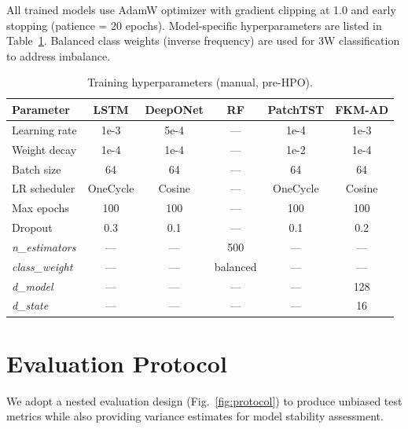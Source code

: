 \documentclass[conference]{IEEEtran}
\begin{document}
All trained models use AdamW optimizer with gradient clipping at 1.0 and early stopping (patience = 20 epochs). Model-specific hyperparameters are listed in Table~\ref{tab:hyperparams}. Balanced class weights (inverse frequency) are used for 3W classification to address imbalance.

\begin{table}[t]
\centering
\caption{Training hyperparameters (manual, pre-HPO).}
\label{tab:hyperparams}
\small
\setlength{\tabcolsep}{2.5pt}
\begin{tabular}{@{}l ccccc @{}}
\toprule
\textbf{Parameter} & \textbf{LSTM} & \textbf{DeepONet} & \textbf{RF} & \textbf{PatchTST} & \textbf{FKM-AD} \\
\midrule
Learning rate      & 1e-3 & 5e-4 & ---  & 1e-4 & 1e-3 \\
Weight decay       & 1e-4 & 1e-4 & ---  & 1e-2 & 1e-4 \\
Batch size         & 64   & 64   & ---  & 64   & 64   \\
LR scheduler       & OneCycle & Cosine & --- & OneCycle & Cosine \\
Max epochs         & 100  & 100  & ---  & 100  & 100  \\
Dropout            & 0.3  & 0.1  & ---  & 0.1  & 0.2  \\
\textit{n\_estimators} & --- & --- & 500 & --- & --- \\
\textit{class\_weight}  & --- & --- & balanced & --- & --- \\
\textit{d\_model}     & --- & --- & --- & --- & 128 \\
\textit{d\_state}     & --- & --- & --- & --- & 16  \\
\bottomrule
\end{tabular}
\end{table}

\section{Evaluation Protocol}
\label{sec:eval}

We adopt a nested evaluation design (Fig.~\ref{fig:protocol}) to produce unbiased test metrics while also providing variance estimates for model stability assessment.
\end{document}
